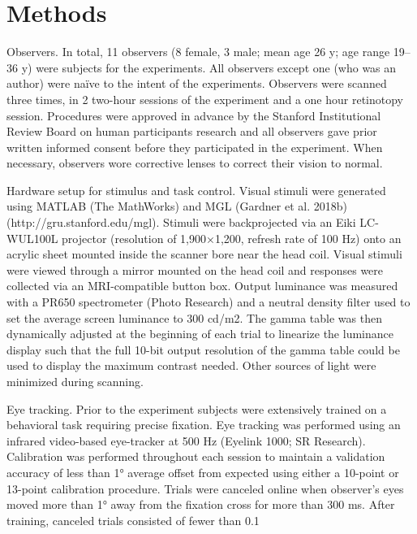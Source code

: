 \documentclass{report}
\begin{document}
\section{Methods}
Observers.
In total, 11 observers (8 female, 3 male; mean age 26 y; age range 19–36 y) were subjects for the experiments. All observers except one (who was an author) were naïve to the intent of the experiments. Observers were scanned three times, in 2 two-hour sessions of the experiment and a one hour retinotopy session. Procedures were approved in advance by the Stanford Institutional Review Board on human participants research and all observers gave prior written informed consent before they participated in the experiment. When necessary, observers wore corrective lenses to correct their vision to normal.

Hardware setup for stimulus and task control.
Visual stimuli were generated using MATLAB (The MathWorks) and MGL (Gardner et al. 2018b) (http://gru.stanford.edu/mgl). Stimuli were backprojected via an Eiki LC-WUL100L projector (resolution of 1,900×1,200, refresh rate of 100 Hz) onto an acrylic sheet mounted inside the scanner bore near the head coil. Visual stimuli were viewed through a mirror mounted on the head coil and responses were collected via an MRI-compatible button box. Output luminance was measured with a PR650 spectrometer (Photo Research) and a neutral density filter used to set the average screen luminance to 300 cd/m2. The gamma table was then dynamically adjusted at the beginning of each trial to linearize the luminance display such that the full 10-bit output resolution of the gamma table could be used to display the maximum contrast needed. Other sources of light were minimized during scanning.

Eye tracking.
Prior to the experiment subjects were extensively trained on a behavioral task requiring precise fixation. Eye tracking was performed using an infrared video-based eye-tracker at 500 Hz (Eyelink 1000; SR Research). Calibration was performed throughout each session to maintain a validation accuracy of less than 1° average offset from expected using either a 10-point or 13-point calibration procedure. Trials were canceled online when observer’s eyes moved more than 1° away from the fixation cross for more than 300 ms. After training, canceled trials consisted of fewer than 0.1%
\end{document}
